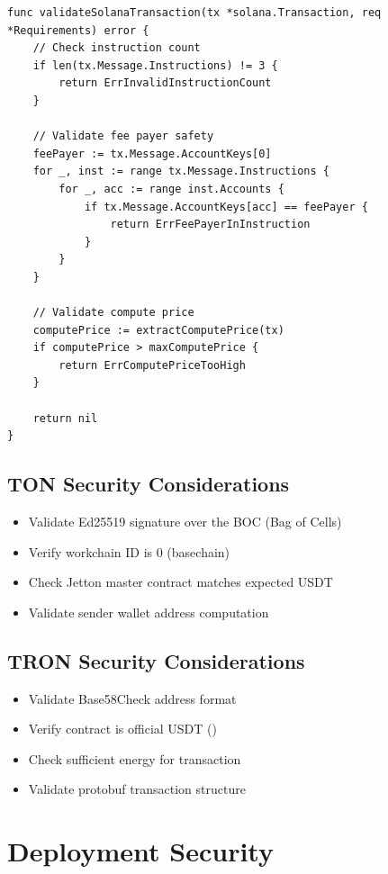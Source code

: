 \begin{lstlisting}[language=golang,caption={Solana security validation}]
func validateSolanaTransaction(tx *solana.Transaction, req *Requirements) error {
    // Check instruction count
    if len(tx.Message.Instructions) != 3 {
        return ErrInvalidInstructionCount
    }

    // Validate fee payer safety
    feePayer := tx.Message.AccountKeys[0]
    for _, inst := range tx.Message.Instructions {
        for _, acc := range inst.Accounts {
            if tx.Message.AccountKeys[acc] == feePayer {
                return ErrFeePayerInInstruction
            }
        }
    }

    // Validate compute price
    computePrice := extractComputePrice(tx)
    if computePrice > maxComputePrice {
        return ErrComputePriceTooHigh
    }

    return nil
}
\end{lstlisting}

\subsection{TON Security Considerations}

\begin{itemize}
    \item Validate Ed25519 signature over the BOC (Bag of Cells)
    \item Verify workchain ID is 0 (basechain)
    \item Check Jetton master contract matches expected USDT
    \item Validate sender wallet address computation
\end{itemize}

\subsection{TRON Security Considerations}

\begin{itemize}
    \item Validate Base58Check address format
    \item Verify contract is official USDT ()
    \item Check sufficient energy for transaction
    \item Validate protobuf transaction structure
\end{itemize}

\section{Deployment Security}
\label{sec:deployment-security}


